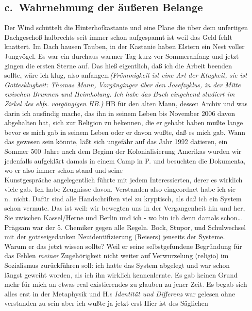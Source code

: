 \documentclass[
]{article}
\author{}
\date{\vspace{-2.5em}}
\begin{document}
\subsection{c.~Wahrnehmung der äußeren
Belange}\label{c.-wahrnehmung-der-uxe4uuxdferen-belange}

Der Wind schüttelt die Hinterhofkastanie und eine Plane die über dem
unfertigen Dachgeschoß halbrechts seit immer schon aufgespannt ist weil
das Geld fehlt knattert. Im Dach hausen Tauben, in der Kastanie haben
Elstern ein Nest voller Jungvögel. Es war ein durchaus warmer Tag kurz
vor Sommeranfang und jetzt gingen die ersten Sterne auf. Das hieß
eigentlich, daß ich die Arbeit beenden sollte, wäre ich klug, also
anfangen.\emph{(Frömmigkeit ist eine Art der Klugheit, sie ist
Gottesklugheit: Thomas Mann, Vorgänginger über den Josefzyklus, in der
Mitte zwischen Brunnen und Heimholung. Ich habe das Buch eingehend
studiert im Zirkel des ebfs. vorgängigen HB.)} HB für den alten Mann,
dessen Archiv und was darin ich ausfindig mache, das ihn in seinem Leben
bis November 2006 davon abgehalten hat, sich zur Religion zu bekennen,
die er gehabt haben mußte lange bevor es mich gab in seinem Leben oder
er davon wußte, daß es mich gab. Wann das gewesen sein könnte, läßt sich
ungefähr auf das Jahr 1992 datieren, ein Sommer 500 Jahre nach dem
Beginn der Kolonialisierung Amerikas wurden wir jedenfalls aufgeklärt
damals in einem Camp in P. und besuchten die Dokumenta, wo er also immer
schon stand und seine\\
Kunstgespräche angelegentlich führte mit jedem Interessierten, derer es
wirklich viele gab. Ich habe Zeugnisse davon. Verstanden also
eingeordnet habe ich sie n.~nicht. Dafür sind alle Handschriften viel zu
kryptisch, als daß ich ein System schon vermute. Das ist weil: wir
bewegten uns in der Vergangenheit hin und her, Sie zwischen Kassel/Herne
und Berlin und ich - wo bin ich denn damals schon\ldots{} Prägsam war
der 5. Chemiker gegen alle Regeln. Bock, Stupor, und Schulwechsel mit
der gottseigedanken Neuidentifizierung (Reisers) jenseits der Systeme.
Warum er das jetzt wissen sollte? Weil er seine selbstgefundene
Begründung für das Fehlen \emph{meiner} Zugehörigkeit nicht weiter auf
Verwurzelung (religio) im Sozialismus zurückführen soll: ich hatte das
System abgelegt und war schon längst geweiht worden, als ich ihn
wirklich kennenlernte. Es gab keinen Grund mehr für mich an etwas real
existierendes zu glauben zu jener Zeit. Es begab sich alles erst in der
Metaphysik und H.s \emph{Identität und Differenz} war gelesen ohne
verstanden zu sein aber ich wußte ja jetzt erst Hier ist des Säglichen
\end{document}

